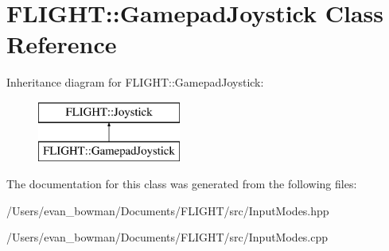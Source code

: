 \hypertarget{class_f_l_i_g_h_t_1_1_gamepad_joystick}{}\section{F\+L\+I\+G\+HT\+:\+:Gamepad\+Joystick Class Reference}
\label{class_f_l_i_g_h_t_1_1_gamepad_joystick}
Inheritance diagram for F\+L\+I\+G\+HT\+:\+:Gamepad\+Joystick\+:\begin{figure}[H]
\begin{center}
\leavevmode
\includegraphics[height=2.000000cm]{class_f_l_i_g_h_t_1_1_gamepad_joystick}
\end{center}
\end{figure}


The documentation for this class was generated from the following files\+:\begin{DoxyCompactItemize}
\item 
/\+Users/evan\+\_\+bowman/\+Documents/\+F\+L\+I\+G\+H\+T/src/Input\+Modes.\+hpp\item 
/\+Users/evan\+\_\+bowman/\+Documents/\+F\+L\+I\+G\+H\+T/src/Input\+Modes.\+cpp\end{DoxyCompactItemize}
